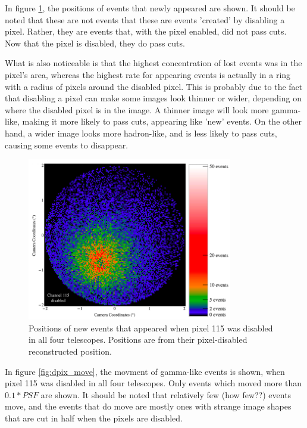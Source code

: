 In figure \ref{fig:dpix_appear}, the positions of events that newly appeared are shown.
It should be noted that these are not events that these are events 'created' by disabling a pixel.
Rather, they are events that, with the pixel enabled, did not pass cuts.
Now that the pixel is disabled, they do pass cuts.

What is also noticeable is that the highest concentration of lost events was in the pixel's area, whereas the highest rate for appearing events is actually in a ring with a radius of  pixels around the disabled pixel.
This is probably due to the fact that disabling a pixel can make some images look thinner or wider, depending on where the disabled pixel is in the image.
A thinner image will look more gamma-like, making it more likely to pass cuts, appearing like 'new' events.
On the other hand, a wider image looks more hadron-like, and is less likely to pass cuts, causing some events to disappear.

\begin{figure}[h]\label{fig:dpix_appear}
  \begin{center}
    \includegraphics[width=0.8\textwidth]{images/disabled_pixel/appearing_events}
    \caption[Newly Appearing Events]{Positions of new events that appeared when pixel 115 was disabled in all four telescopes.  Positions are from their pixel-disabled reconstructed position.}
  \end{center}
\end{figure}

In figure \ref{fig:dpix_move}, the movment of gamma-like events is shown, when pixel 115 was disabled in all four telescopes.
Only events which moved more than $0.1*PSF$ are shown.
It should be noted that relatively few (how few??) events move, and the events that do move are mostly ones with strange image shapes that are cut in half when the pixels are disabled.

